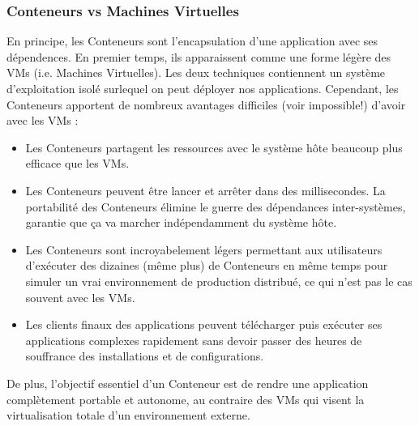 \documentclass[a4paper,11pt,oneside]{report}
\begin{document}
\subsubsection{Conteneurs vs Machines Virtuelles}
En principe, les Conteneurs sont l'encapsulation d'une application avec ses dépendences. En premier temps, ils apparaissent comme une forme légère des VMs (i.e. Machines Virtuelles). Les deux techniques contiennent un système d'exploitation isolé surlequel on peut déployer nos applications. Cependant, les Conteneurs apportent de nombreux avantages difficiles (voir impossible!) d'avoir avec les VMs :
\begin{itemize}
\item Les Conteneurs partagent les ressources avec le système hôte beaucoup plus efficace que les VMs. 
\item Les Conteneurs peuvent être lancer et arrêter dans des millisecondes. 
La portabilité des Conteneurs élimine le guerre des dépendances inter-systèmes, garantie que ça va marcher indépendamment du système hôte. 
\item Les Conteneurs sont incroyabelement légers permettant aux utilisateurs d'exécuter des dizaines (même plus) de Conteneurs en même temps pour simuler un vrai environnement de production distribué, ce qui n'est pas le cas souvent avec les VMs. 
\item Les clients finaux des applications peuvent télécharger puis exécuter ses applications complexes rapidement sans devoir passer des heures de souffrance des installations et de configurations. 
\newline
\end{itemize}

De plus, l'objectif essentiel d'un Conteneur est de rendre une application complètement portable et autonome, au contraire des VMs qui visent la virtualisation totale d'un environnement externe.
\end{document}
